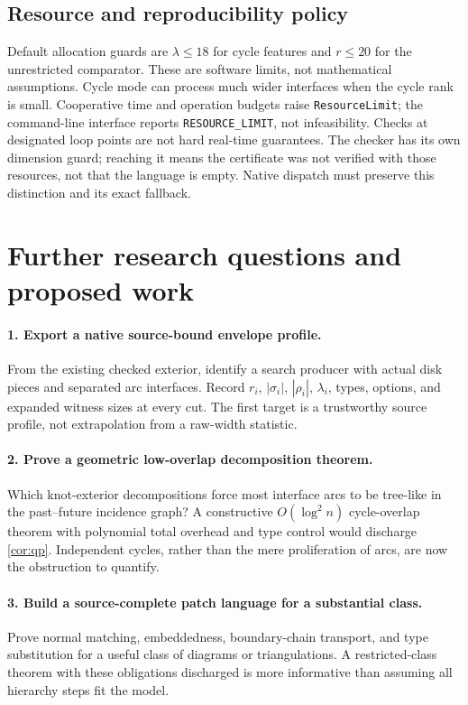 \documentclass[11pt,a4paper]{article}
\theoremstyle{definition}
\theoremstyle{remark}
\begin{document}
\subsection{Resource and reproducibility policy}
Default allocation guards are $\lambda\le18$ for cycle features and $r\le20$ for the
unrestricted comparator. These are software limits, not mathematical assumptions. Cycle
mode can process much wider interfaces when the cycle rank is small.
Cooperative time and operation budgets raise \texttt{ResourceLimit}; the command-line
interface reports \texttt{RESOURCE\_LIMIT}, not infeasibility. Checks at designated loop
points are not hard real-time guarantees. The checker has its own dimension guard;
reaching it means the certificate was not verified with those resources, not that the
language is empty. Native dispatch must preserve this distinction and its exact fallback.

\section{Further research questions and proposed work}\label{sec:questions}
\paragraph{1. Export a native source-bound envelope profile.}
From the existing checked exterior, identify a search producer with actual disk pieces
and separated arc interfaces. Record $r_i$, $|\sigma_i|$, $|\rho_i|$, $\lambda_i$,
types, options, and expanded witness sizes at every cut. The first target is a trustworthy
source profile, not extrapolation from a raw-width statistic.

\paragraph{2. Prove a geometric low-overlap decomposition theorem.}
Which knot-exterior decompositions force most interface arcs to be tree-like in the
past--future incidence graph? A constructive $O(\log^2 n)$ cycle-overlap theorem with
polynomial total overhead and type control would discharge \cref{cor:qp}. Independent
cycles, rather than the mere proliferation of arcs, are now the obstruction to quantify.

\paragraph{3. Build a source-complete patch language for a substantial class.}
Prove normal matching, embeddedness, boundary-chain transport, and type substitution
for a useful class of diagrams or triangulations. A restricted-class theorem with these
obligations discharged is more informative than assuming all hierarchy steps fit the model.
\end{document}
